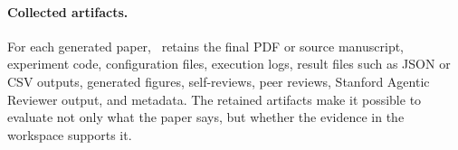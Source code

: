 \paragraph{Collected artifacts.}
For each generated paper, \ra\ retains the final PDF or source manuscript, experiment code, configuration files, execution logs, result files such as JSON or CSV outputs, generated figures, self-reviews, peer reviews, Stanford Agentic Reviewer output, and metadata. The retained artifacts make it possible to evaluate not only what the paper says, but whether the evidence in the workspace supports it.
